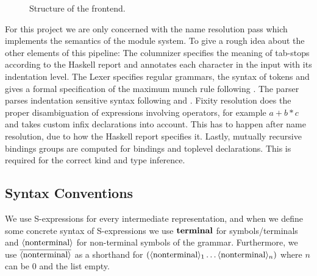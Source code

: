 \begin{figure}[h]
\begin{center}
  \end{center}
  \caption{Structure of the frontend.}
  \label{fig:intro:structure}
\end{figure}

For this project we are only concerned with the name resolution pass which implements the semantics of the module system.
To give a rough idea about the other elements of this pipeline:
The columnizer specifies the meaning of tab-stops according to the Haskell report and annotates each character in the input with its indentation level.
The Lexer specifies regular grammars, the syntax of tokens and gives a formal specification of the maximum munch rule following \citet{Egolf2021verbatim}.
The parser parses indentation sensitive syntax following \citet{Adams2013parsing} and \citet{Adams2014parsec}.
Fixity resolution does the proper disambiguation of expressions involving operators, for example $a + b * c$ and takes custom infix declarations into account.
This has to happen after name resolution, due to how the Haskell report specifies it.
Lastly, mutually recursive bindings groups are computed for bindings and toplevel declarations. This is required for the correct kind and type inference.

\subsection{Syntax Conventions}
We use S-expressions for every intermediate representation, and when we define some concrete syntax of S-expressions we use $\textbf{terminal}$ for symbols/terminals and $\langle \text{nonterminal} \rangle$ for non-terminal symbols of the grammar.
Furthermore, we use $\overline{\langle \text{nonterminal} \rangle}$ as a shorthand for $(\langle \text{nonterminal} \rangle_1 \ldots \langle \text{nonterminal} \rangle_n)$ where $n$ can be 0 and the list empty.